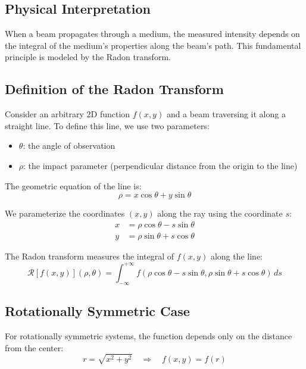 \documentclass[11pt,a4paper]{article}
\begin{document}
\subsection{Physical Interpretation}

When a beam propagates through a medium, the measured intensity depends on the integral of the medium's properties along the beam's path. This fundamental principle is modeled by the Radon transform.

\subsection{Definition of the Radon Transform}

Consider an arbitrary 2D function $f(x,y)$ and a beam traversing it along a straight line. To define this line, we use two parameters:
\begin{itemize}
    \item $\theta$: the angle of observation
    \item $\rho$: the impact parameter (perpendicular distance from the origin to the line)
\end{itemize}

The geometric equation of the line is:
\begin{equation}
\rho = x\cos\theta + y\sin\theta
\end{equation}

We parameterize the coordinates $(x,y)$ along the ray using the coordinate $s$:
\begin{align}
x &= \rho \cos\theta - s \sin\theta \\
y &= \rho \sin\theta + s \cos\theta
\end{align}

The Radon transform measures the integral of $f(x,y)$ along the line:
\begin{equation}
\mathcal{R}[f(x,y)](\rho, \theta) = \int_{-\infty}^{+\infty} f(\rho \cos\theta - s \sin\theta, \rho \sin\theta + s \cos\theta) \, ds
\end{equation}

\subsection{Rotationally Symmetric Case}

For rotationally symmetric systems, the function depends only on the distance from the center:
\begin{equation}
r = \sqrt{x^2 + y^2} \quad \Rightarrow \quad f(x,y) = f(r)
\end{equation}
\end{document}
